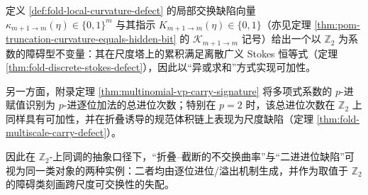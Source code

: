 \begin{proposition}\label{prop:pom-curvature-carry-defect-z2-obstruction-principle}
定义 \ref{def:fold-local-curvature-defect} 的局部交换缺陷向量 \(\kappa_{m+1\to m}(\eta)\in\{0,1\}^m\) 与其指示 \(K_{m+1\to m}(\eta)\in\{0,1\}\)（亦见定理 \ref{thm:pom-truncation-curvature-equals-hidden-bit} 的 \(\mathcal K_{m+1\to m}\) 记号）给出一个以 \(\mathbb Z_2\) 为系数的障碍型不变量：其在尺度塔上的累积满足离散广义 Stokes 恒等式（定理 \ref{thm:fold-discrete-stokes-defect}），因此以“异或求和”方式实现可加性。
\par
另一方面，附录定理 \ref{thm:multinomial-vp-carry-signature} 将多项式系数的 \(p\)-进赋值识别为 \(p\)-进逐位加法的总进位次数；特别在 \(p=2\) 时，该总进位次数在 \(\mathbb Z_2\) 上同样具有可加性，并在折叠诱导的规范体积链上表现为尺度缺陷（定理 \ref{thm:fold-multiscale-carry-defect}）。
\par
因此在 \(\mathbb Z_2\)-上同调的抽象口径下，“折叠--截断的不交换曲率”与“二进进位缺陷”可视为同一类对象的两种实例：二者均由逐位进位/溢出机制生成，并作为取值于 \(\mathbb Z_2\) 的障碍类刻画跨尺度可交换性的失配。
\end{proposition}
